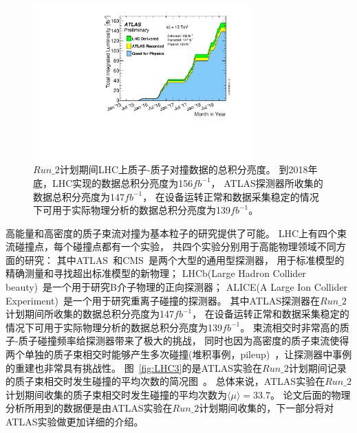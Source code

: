 \begin{figure}
  \begin{center}
    \includegraphics[width=0.75\textwidth]{figuresEXP/LHC2.pdf}
  \end{center}
  \caption{
  $Run\_2$计划期间LHC上质子-质子对撞数据的总积分亮度。
  到2018年底，LHC实现的数据总积分亮度为156$fb^{-1}$，
  ATLAS探测器所收集的数据总积分亮度为147$fb^{-1}$，
  在设备运转正常和数据采集稳定的情况下可用于实际物理分析的数据总积分亮度为139$fb^{-1}$。
  }
    \label{fig:LHC2}
\end{figure}

高能量和高密度的质子束流对撞为基本粒子的研究提供了可能。
LHC上有四个束流碰撞点，每个碰撞点都有一个实验，
共四个实验分别用于高能物理领域不同方面的研究：
其中ATLAS~\cite{PERF-2007-01}和CMS~\cite{CMS}是两个大型的通用型探测器，
用于标准模型的精确测量和寻找超出标准模型的新物理；
LHCb(Large Hadron Collider beauty)~\cite{LHCb}是一个用于研究B介子物理的正向探测器；
ALICE(A Large Ion Collider Experiment)~\cite{ALICE}是一个用于研究重离子碰撞的探测器。
其中ATLAS探测器在$Run\_2$计划期间所收集的数据总积分亮度为147$fb^{-1}$，
在设备运转正常和数据采集稳定的情况下可用于实际物理分析的数据总积分亮度为139$fb^{-1}$。
束流相交时非常高的质子-质子碰撞频率给探测器带来了极大的挑战，
同时也因为高密度的质子束流使得两个单独的质子束相交时能够产生多次碰撞(堆积事例，pileup)~\cite{PileUp}，让探测器中事例的重建也非常具有挑战性。
图~\ref{fig:LHC3}的是ATLAS实验在$Run\_2$计划期间记录的质子束相交时发生碰撞的平均次数的简况图~\cite{ATLASWEB1}。
总体来说，ATLAS实验在$Run\_2$计划期间收集的质子束相交时发生碰撞的平均次数为$\langle\mu\rangle=33.7$。
论文后面的物理分析所用到的数据便是由\textsc{ATLAS}实验在$Run\_2$计划期间收集的，下一部分将对ATLAS实验做更加详细的介绍。

